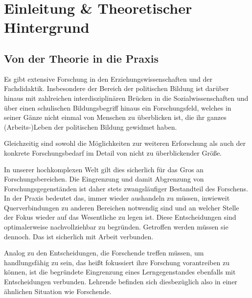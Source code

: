



\section{Einleitung \& Theoretischer Hintergrund}

\subsection{Von der Theorie in die Praxis \label{theorie in praxis}}
Es gibt extensive Forschung in den Erziehungswissenschaften und der Fachdidaktik. Insbesondere der Bereich der politischen Bildung ist darüber hinaus mit zahlreichen interdisziplinären Brücken in die Sozialwissenschaften und über einen schulischen Bildungsbegriff hinaus ein Forschungsfeld, welches in seiner Gänze nicht einmal von Menschen zu überblicken ist, die ihr ganzes (Arbeits-)Leben der politischen Bildung gewidmet haben. 

Gleichzeitig sind sowohl die Möglichkeiten zur weiteren Erforschung als auch der konkrete Forschungsbedarf im Detail von nicht zu überblickender Größe. 

In unserer hochkomplexen Welt gilt dies sicherlich für das Gros an Forschungsbereichen. Die Eingrenzung und damit Abgrenzung von Forschungsgegenständen ist daher stets zwangsläufiger Bestandteil des Forschens. In der Praxis bedeutet das, immer wieder aushandeln zu müssen, inwieweit Querverbindungen zu anderen Bereichen notwendig sind und an welcher Stelle der Fokus wieder auf das Wesentliche zu legen ist.
Diese Entscheidungen sind optimalerweise nachvollziehbar zu begründen. Getroffen werden müssen sie dennoch. Das ist sicherlich mit Arbeit verbunden. 

Analog zu den Entscheidungen, die Forschende treffen müssen, um handlungsfähig zu sein, das heißt fokussiert ihre Forschung vorantreiben zu können, ist die begründete Eingrenzung eines Lerngegenstandes ebenfalls mit Entscheidungen verbunden. 
Lehrende befinden sich diesbezüglich also in einer ähnlichen Situation wie Forschende. 

